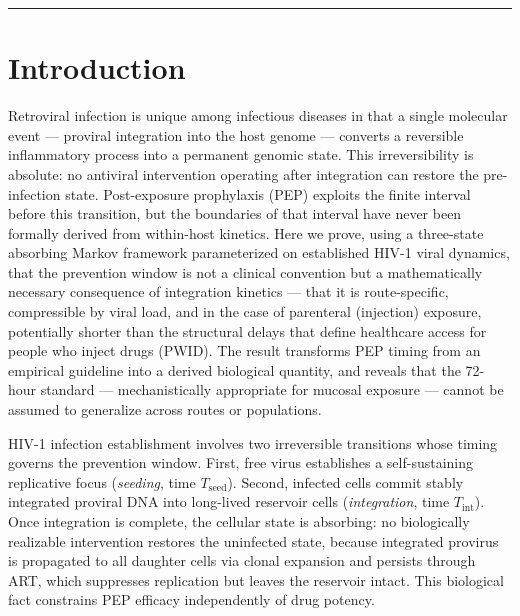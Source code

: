 \documentclass[11pt]{article}
\theoremstyle{definition}
\theoremstyle{remark}
\newcommand{\Tseed}{T_{\text{seed}}}
\newcommand{\Tint}{T_{\text{int}}}
\begin{document}
\vspace{1em}
\hrule
\vspace{1em}

\section*{Introduction}

Retroviral infection is unique among infectious diseases in that a single molecular event --- proviral integration into the host genome --- converts a reversible inflammatory process into a permanent genomic state. This irreversibility is absolute: no antiviral intervention operating after integration can restore the pre-infection state. Post-exposure prophylaxis (PEP) exploits the finite interval before this transition, but the boundaries of that interval have never been formally derived from within-host kinetics. Here we prove, using a three-state absorbing Markov framework parameterized on established HIV-1 viral dynamics\cite{tanner2025,wahl2023}, that the prevention window is not a clinical convention but a mathematically necessary consequence of integration kinetics --- that it is route-specific, compressible by viral load, and in the case of parenteral (injection) exposure, potentially shorter than the structural delays that define healthcare access for people who inject drugs (PWID). The result transforms PEP timing from an empirical guideline into a derived biological quantity, and reveals that the 72-hour standard --- mechanistically appropriate for mucosal exposure --- cannot be assumed to generalize across routes or populations.

HIV-1 infection establishment involves two irreversible transitions whose timing governs the prevention window. First, free virus establishes a self-sustaining replicative focus (\emph{seeding}, time $\Tseed$). Second, infected cells commit stably integrated proviral DNA into long-lived reservoir cells (\emph{integration}, time $\Tint$). Once integration is complete, the cellular state is absorbing: no biologically realizable intervention restores the uninfected state, because integrated provirus is propagated to all daughter cells via clonal expansion\cite{wahl2023,siliciano2015} and persists through ART, which suppresses replication but leaves the reservoir intact\cite{perelson1997}. This biological fact constrains PEP efficacy independently of drug potency.

\end{document}
